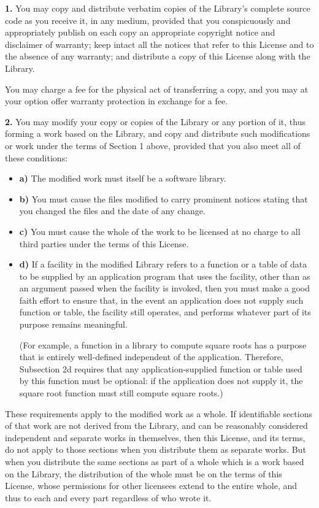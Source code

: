 \documentclass[]{article}
\begin{document}
\textbf{1.} You may copy and distribute verbatim copies of the Library's
complete source code as you receive it, in any medium, provided that you
conspicuously and appropriately publish on each copy an appropriate
copyright notice and disclaimer of warranty; keep intact all the notices
that refer to this License and to the absence of any warranty; and
distribute a copy of this License along with the Library.

You may charge a fee for the physical act of transferring a copy, and
you may at your option offer warranty protection in exchange for a fee.

\textbf{2.} You may modify your copy or copies of the Library or any
portion of it, thus forming a work based on the Library, and copy and
distribute such modifications or work under the terms of Section 1
above, provided that you also meet all of these conditions:

\begin{itemize}
\item
  \textbf{a)} The modified work must itself be a software library.
\item
  \textbf{b)} You must cause the files modified to carry prominent
  notices stating that you changed the files and the date of any change.
\item
  \textbf{c)} You must cause the whole of the work to be licensed at no
  charge to all third parties under the terms of this License.
\item
  \textbf{d)} If a facility in the modified Library refers to a function
  or a table of data to be supplied by an application program that uses
  the facility, other than as an argument passed when the facility is
  invoked, then you must make a good faith effort to ensure that, in the
  event an application does not supply such function or table, the
  facility still operates, and performs whatever part of its purpose
  remains meaningful.

  (For example, a function in a library to compute square roots has a
  purpose that is entirely well-defined independent of the application.
  Therefore, Subsection 2d requires that any application-supplied
  function or table used by this function must be optional: if the
  application does not supply it, the square root function must still
  compute square roots.)
\end{itemize}

These requirements apply to the modified work as a whole. If
identifiable sections of that work are not derived from the Library, and
can be reasonably considered independent and separate works in
themselves, then this License, and its terms, do not apply to those
sections when you distribute them as separate works. But when you
distribute the same sections as part of a whole which is a work based on
the Library, the distribution of the whole must be on the terms of this
License, whose permissions for other licensees extend to the entire
whole, and thus to each and every part regardless of who wrote it.
\end{document}
